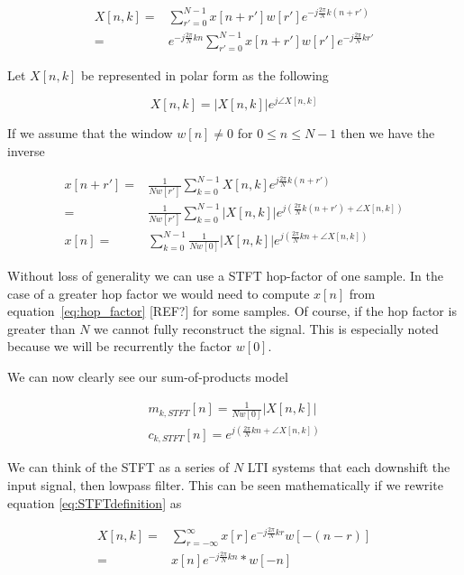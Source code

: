 \documentclass [11pt, proquest] {uwthesis}[2015/03/03]
\begin{document}
\begin{align}
X[n,k] =& \sum\limits_{r'=0}^{N-1} x[n + r'] w[r'] e^{-j\frac{2\pi}{N}k(n + r')} \nonumber \\
=& e^{-j\frac{2\pi}{N}kn} \sum\limits_{r'=0}^{N-1} x[n + r'] w[r'] e^{-j\frac{2\pi}{N}kr'}
\end{align}

Let $X[n,k]$ be represented in polar form as the following

\begin{equation}
X[n,k] = \vert X[n,k]\vert e^{j\angle X[n,k]}
\end{equation}

If we assume that the window $w[n] \neq 0$ for $0 \leq n \leq N-1$ then we have the inverse

\begin{align}
\label{eq:hop_factor}
x[n + r'] =& \frac{1}{Nw[r']}  \sum\limits_{k=0}^{N-1} X[n,k] e^{j\frac{2\pi}{N}k(n+r')} \nonumber \\
=& \frac{1}{Nw[r']}  \sum\limits_{k=0}^{N-1} \vert X[n,k]\vert e^{j(\frac{2\pi}{N}k(n+r') + \angle X[n,k])} \\
x[n] =&\sum\limits_{k=0}^{N-1}  \frac{1}{Nw[0]}  \vert X[n,k]\vert e^{j(\frac{2\pi}{N}kn + \angle X[n,k])}
\end{align}

Without loss of generality we can use a STFT hop-factor of one sample.  In the case of a greater hop factor we would need to compute $x[n]$ from equation~\ref{eq:hop_factor} [REF?] for some samples.  Of course, if the hop factor is greater than $N$ we cannot fully reconstruct the signal.  This is especially noted because we will be recurrently the factor $w[0]$.

We can now clearly see our sum-of-products model

\begin{align}
\label{eq:envelope_STFT}
m_{k,STFT}[n] =  \frac{1}{Nw[0]}  \vert X[n,k]\vert \\
c_{k,STFT}[n] = e^{j(\frac{2\pi}{N}kn + \angle X[n,k])}
\end{align}

We can think of the STFT as a series of $N$ LTI systems that each downshift the input signal, then lowpass filter.  This can be seen mathematically if we rewrite equation \ref{eq:STFTdefinition} as

\begin{align}
X[n,k] =& \sum\limits_{r=-\infty}^{\infty} x[r] e^{-j\frac{2\pi}{N}kr} w[-(n - r)] \nonumber \\
=& x[n] e^{-j\frac{2\pi}{N}kn} * w[-n]
\end{align}
\end{document}
